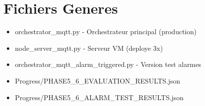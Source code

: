 \documentclass[12pt,a4paper]{report}
\begin{document}
\chapter{Fichiers Generes}

\begin{itemize}
    \item orchestrator\_mqtt.py - Orchestrateur principal (production)
    \item node\_server\_mqtt.py - Serveur VM (deploye 3x)
    \item orchestrator\_mqtt\_alarm\_triggered.py - Version test alarmes
    \item Progress/PHASE5\_6\_EVALUATION\_RESULTS.json
    \item Progress/PHASE5\_6\_ALARM\_TEST\_RESULTS.json
\end{itemize}
\end{document}
